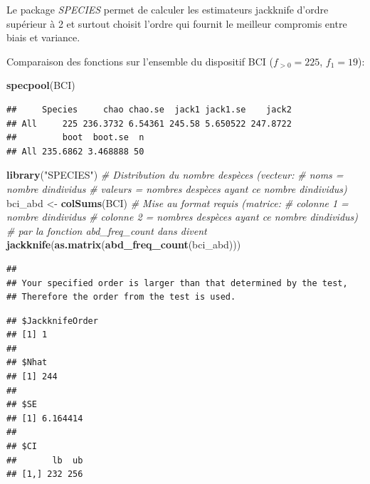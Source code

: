 \documentclass[
  11pt,
  american,
  a4paper,
  extrafontsizes,onecolumn,openright
  ]{memoir}
\newenvironment{Shaded}{\begin{snugshade}}{\end{snugshade}}
\newcommand{\CommentTok}[1]{\textcolor[rgb]{0.56,0.35,0.01}{\textit{#1}}}
\newcommand{\FunctionTok}[1]{\textcolor[rgb]{0.13,0.29,0.53}{\textbf{#1}}}
\newcommand{\NormalTok}[1]{#1}
\newcommand{\OtherTok}[1]{\textcolor[rgb]{0.56,0.35,0.01}{#1}}
\newcommand{\StringTok}[1]{\textcolor[rgb]{0.31,0.60,0.02}{#1}}
\begin{document}
\normalsize

Le package \emph{SPECIES} \autocite{Wang2011} permet de calculer les estimateurs jackknife d'ordre supérieur à 2 et surtout choisit l'ordre qui fournit le meilleur compromis entre biais et variance.

Comparaison des fonctions sur l'ensemble du dispositif BCI (\(f_{>0}=225\), \(f_1=19\)):

\scriptsize

\begin{Shaded}
\begin{Highlighting}[]
\FunctionTok{specpool}\NormalTok{(BCI)}
\end{Highlighting}
\end{Shaded}

\begin{verbatim}
##     Species     chao chao.se  jack1 jack1.se    jack2
## All     225 236.3732 6.54361 245.58 5.650522 247.8722
##         boot  boot.se  n
## All 235.6862 3.468888 50
\end{verbatim}

\begin{Shaded}
\begin{Highlighting}[]
\FunctionTok{library}\NormalTok{(}\StringTok{"SPECIES"}\NormalTok{)}
\CommentTok{\# Distribution du nombre d\textquotesingle{}espèces (vecteur: }
\CommentTok{\# noms = nombre d\textquotesingle{}individus}
\CommentTok{\# valeurs = nombres d\textquotesingle{}espèces ayant ce nombre d\textquotesingle{}individus)}
\NormalTok{bci\_abd }\OtherTok{\textless{}{-}} \FunctionTok{colSums}\NormalTok{(BCI)}
\CommentTok{\# Mise au format requis (matrice:}
\CommentTok{\# colonne 1 = nombre d\textquotesingle{}individus}
\CommentTok{\# colonne 2 = nombres d\textquotesingle{}espèces ayant ce nombre d\textquotesingle{}individus)}
\CommentTok{\# par la fonction abd\_freq\_count dans divent}
\FunctionTok{jackknife}\NormalTok{(}\FunctionTok{as.matrix}\NormalTok{(}\FunctionTok{abd\_freq\_count}\NormalTok{(bci\_abd)))}
\end{Highlighting}
\end{Shaded}

\begin{verbatim}
## 
## Your specified order is larger than that determined by the test, 
## Therefore the order from the test is used.
\end{verbatim}

\begin{verbatim}
## $JackknifeOrder
## [1] 1
## 
## $Nhat
## [1] 244
## 
## $SE
## [1] 6.164414
## 
## $CI
##       lb  ub
## [1,] 232 256
\end{verbatim}
\end{document}
